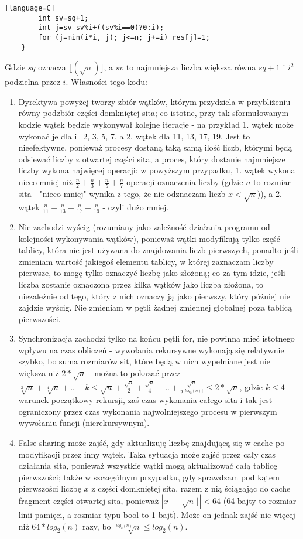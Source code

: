 \documentclass[12pt]{article}
\begin{document}
\begin {enumerate}
\begin{lstlisting}[style=mystyle, caption= Sito funkcyjne ze static schedulingiem][language=C]
		int sv=sq+1;
		int j=sv-sv%i+((sv%i==0)?0:i);
		for (j=min(i*i, j); j<=n; j+=i) res[j]=1;
	}
	\end{lstlisting}
	Gdzie \(sq\) oznacza \(\lfloor(\sqrt{n})\rfloor\), a \(sv\) to najmniejsza liczba większa równa \(sq+1\) i \(i^2\) podzielna przez \(i\). Własności tego kodu:
	\begin{enumerate}
		\item Dyrektywa powyżej tworzy zbiór wątków, którym przydziela w przybliżeniu równy podzbiór części domkniętej sita; co istotne, przy tak sformułowanym kodzie wątek będzie wykonywał kolejne iteracje - na przykład 1. wątek może wykonać je dla i=2, 3, 5, 7, a 2. wątek dla 11, 13, 17, 19. Jest to nieefektywne, ponieważ procesy dostaną taką samą ilość liczb, którymi będą odsiewać liczby z otwartej części sita, a proces, który dostanie najmniejsze liczby wykona najwięcej operacji: w powyższym przypadku, 1. wątek wykona nieco mniej niż \(\frac{n}{2}+\frac{n}{3}+\frac{n}{5}+\frac{n}{7}\) operacji oznaczenia liczby (gdzie \(n\) to rozmiar sita - "nieco mniej" wynika z tego, że nie odznaczam liczb \(x<\sqrt{n})\)), a 2. wątek \(\frac{n}{11}+\frac{n}{13}+\frac{n}{17}+\frac{n}{19}\) - czyli dużo mniej.
		\item Nie zachodzi wyścig (rozumiany jako zależność działania programu od kolejności wykonywania wątków), ponieważ wątki modyfikują tylko część tablicy, która nie jest używana do znajdowania liczb pierwszych, ponadto jeśli zmieniam wartość jakiegoś elementu tablicy, w której zaznaczam liczby pierwsze, to mogę tylko oznaczyć liczbę jako złożoną; co za tym idzie, jeśli liczba zostanie oznaczona przez kilka wątków jako liczba złożona, to niezależnie od tego, który z nich oznaczy ją jako pierwszy, który później nie zajdzie wyścig. Nie zmieniam w pętli żadnej zmiennej globalnej poza tablicą pierwszości.
		\item Synchronizacja zachodzi tylko na końcu pętli for, nie powinna mieć istotnego wpływu na czas obliczeń - wywołania rekursywne wykonają się relatywnie szybko, bo suma rozmiarów sit, które będą w nich wypełniane jest nie większa niż \(2*\sqrt{n}\) - można to pokazać przez \(\sqrt[2]{n}+\sqrt[4]{n}+..+k\le\sqrt{n}+\frac{\sqrt{n}}{2}+\frac{\sqrt{n}}{4}+..+\frac{\sqrt{n}}{2^{\lfloor log_2(n) \rfloor}}\le 2*\sqrt{n}\), gdzie \(k \le 4\) - warunek początkowy rekursji, zaś czas wykonania całego sita i tak jest ograniczony przez czas wykonania najwolniejszego procesu w pierwszym wywołaniu funcji (nierekursywnym).
		\item False sharing może zajść, gdy aktualizuję liczbę znajdującą się w cache po modyfikacji przez inny wątek. Taka sytuacja może zajść przez cały czas działania sita, ponieważ wszystkie wątki mogą aktualizować całą tablicę pierwszości; także w szczególnym przypadku, gdy sprawdzam pod kątem pierwszości liczbę \(x\) z części domkniętej sita, razem z nią ściągając do cache fragment części otwartej sita, ponieważ \(|x-\lfloor\sqrt{n}\rfloor|<64\) (64 bajty to rozmiar linii pamięci, a rozmiar typu bool to 1 bajt). Może on jednak zajść nie więcej niż \(64*log_2(n)\) razy, bo \(\sqrt[log_2(n)]{n}\le log_2(n)\).

\end{enumerate}
\end{enumerate}
\end{document}
